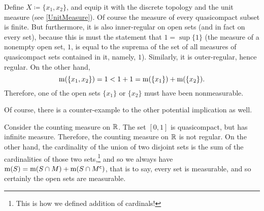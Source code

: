 \begin{exm}\label{exm5.1.42}
Define $X\coloneqq \{ x_1,x_2\}$, and equip it with the discrete topology and the unit measure (see \cref{UnitMeasure}).  Of course the measure of every quasicompact subset is finite.  But furthermore, it is also inner-regular on open sets (and in fact on every set), because this is must the statement that $1=\sup \{ 1\}$ (the measure of a nonempty open set, $1$, is equal to the suprema of the set of all measures of quasicompact sets contained in it, namely, $1$).  Similarly, it is outer-regular, hence regular.  On the other hand,
\begin{equation}
\mathrm{m} (\{ x_1,x_2\} )=1<1+1=\mathrm{m} (\{ x_1\} )+\mathrm{m} (\{ x_2\} ).
\end{equation}
Therefore, one of the open sets $\{ x_1\}$ or $\{ x_2\}$ must have been nonmeasurable.
\end{exm}
Of course, there is a counter-example to the other potential implication as well.
\begin{exm}
Consider the counting measure on $\mathbb{R}$.  The set $[0,1]$ is quasicompact, but has infinite measure.  Therefore, the counting measure on $\mathbb{R}$ is not regular.  On the other hand, the cardinality of the union of two disjoint sets is the sum of the cardinalities of those two sets,\footnote{This is how we defined addition of cardinals!} and so we always have $\mathrm{m} (S)=\mathrm{m} (S\cap M)+\mathrm{m} (S\cap M^{\mathsf{c}})$, that is to say, every set is measurable, and so certainly the open sets are measurable.
\end{exm}

